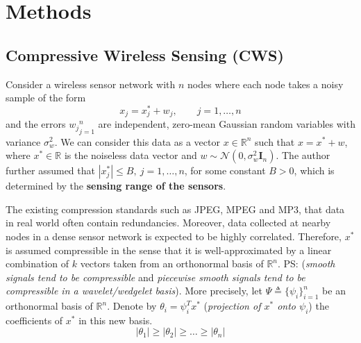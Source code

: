 \chapter{Methods}
\section{Compressive Wireless Sensing (CWS)}

Consider a wireless sensor network with $n$ nodes where each node takes a noisy sample of the form
\begin{equation}
    x_{j} = x^{*}_{j} + w_{j}, \qquad j = 1,\dots,n
    \label{eq2.1.3}
\end{equation}
and the errors ${w_j}_{j=1}^n$ are independent, zero-mean Gaussian random variables with variance $\sigma_w^2$. We can consider this data as a vector $x \in \mathbb{R}^{n}$ such that $x = x^*+w$, where $x^* \in \mathbb{R}$ is the noiseless data vector and $w \sim \mathcal{N}(0,\sigma^2_w\mathbf{I}_n)$. The author further assumed that $\left|x_j^*\right| \leq B, \ j=1,\dots,n$, for some constant $B > 0$, which is determined by the \textbf{\textcolor[rgb]{1,0,0}{sensing range of the sensors}}.

The existing  compression standards such as JPEG, MPEG and MP3, that data in real world often contain redundancies. Moreover, data collected at nearby nodes in a dense sensor network is expected to be highly correlated. Therefore, $x^*$ is assumed compressible in the sense that it is well-approximated by a linear combination of $k$ vectors taken from an orthonormal basis of $\mathbb{R}^n$. PS: (\emph{\textcolor[rgb]{1,0,0}{smooth signals tend to be compressible}} and \emph{\textcolor[rgb]{1,0,0}{piecewise smooth signals tend to be compressible in a wavelet/wedgelet basis}}). More precisely, let $\Psi \triangleq \{\psi_i\}^n_{i=1}$ be an orthonormal basis of $\mathbb{R}^n$. Denote by $\theta_i = \psi^T_i x^*$ (\emph{\textcolor[rgb]{1,0,0}{projection of $x^*$ onto $\psi_i$}}) the coefficients of $x^*$ in this new basis.
\begin{equation}
    |\theta_1| \geq |\theta_2| \geq \dots \geq |\theta_n|
    \label{eq2.1.4}
\end{equation}

